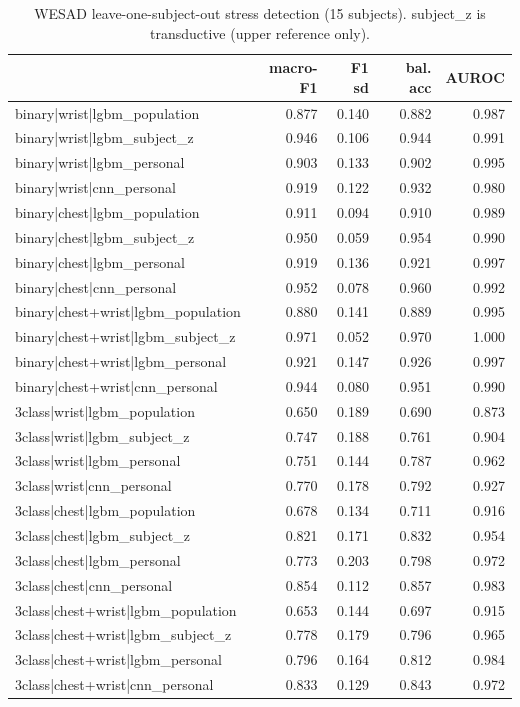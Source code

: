 \begin{table}
\caption{WESAD leave-one-subject-out stress detection (15 subjects). subject_z is transductive (upper reference only).}
\label{tab:stress_results}
\begin{tabular}{lrrrr}
\toprule
 & macro-F1 & F1 sd & bal. acc & AUROC \\
\midrule
binary|wrist|lgbm_population & 0.877 & 0.140 & 0.882 & 0.987 \\
binary|wrist|lgbm_subject_z & 0.946 & 0.106 & 0.944 & 0.991 \\
binary|wrist|lgbm_personal & 0.903 & 0.133 & 0.902 & 0.995 \\
binary|wrist|cnn_personal & 0.919 & 0.122 & 0.932 & 0.980 \\
binary|chest|lgbm_population & 0.911 & 0.094 & 0.910 & 0.989 \\
binary|chest|lgbm_subject_z & 0.950 & 0.059 & 0.954 & 0.990 \\
binary|chest|lgbm_personal & 0.919 & 0.136 & 0.921 & 0.997 \\
binary|chest|cnn_personal & 0.952 & 0.078 & 0.960 & 0.992 \\
binary|chest+wrist|lgbm_population & 0.880 & 0.141 & 0.889 & 0.995 \\
binary|chest+wrist|lgbm_subject_z & 0.971 & 0.052 & 0.970 & 1.000 \\
binary|chest+wrist|lgbm_personal & 0.921 & 0.147 & 0.926 & 0.997 \\
binary|chest+wrist|cnn_personal & 0.944 & 0.080 & 0.951 & 0.990 \\
3class|wrist|lgbm_population & 0.650 & 0.189 & 0.690 & 0.873 \\
3class|wrist|lgbm_subject_z & 0.747 & 0.188 & 0.761 & 0.904 \\
3class|wrist|lgbm_personal & 0.751 & 0.144 & 0.787 & 0.962 \\
3class|wrist|cnn_personal & 0.770 & 0.178 & 0.792 & 0.927 \\
3class|chest|lgbm_population & 0.678 & 0.134 & 0.711 & 0.916 \\
3class|chest|lgbm_subject_z & 0.821 & 0.171 & 0.832 & 0.954 \\
3class|chest|lgbm_personal & 0.773 & 0.203 & 0.798 & 0.972 \\
3class|chest|cnn_personal & 0.854 & 0.112 & 0.857 & 0.983 \\
3class|chest+wrist|lgbm_population & 0.653 & 0.144 & 0.697 & 0.915 \\
3class|chest+wrist|lgbm_subject_z & 0.778 & 0.179 & 0.796 & 0.965 \\
3class|chest+wrist|lgbm_personal & 0.796 & 0.164 & 0.812 & 0.984 \\
3class|chest+wrist|cnn_personal & 0.833 & 0.129 & 0.843 & 0.972 \\
\bottomrule
\end{tabular}
\end{table}
